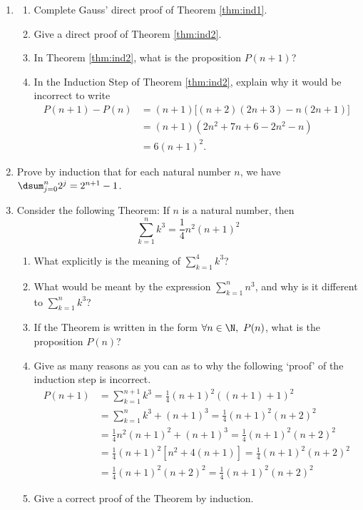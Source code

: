 \begin{enumerate}\renewcommand{\labelenumi}{\thesubsection.\theenumi}
  \item\begin{enumerate}
    \item Complete Gauss' direct proof of Theorem \ref{thm:ind1}.
    \item Give a direct proof of Theorem \ref{thm:ind2}.
    \item In Theorem \ref{thm:ind2}, what is the proposition $P(n+1)$?
    \item In the Induction Step of Theorem \ref{thm:ind2}, explain why it would be incorrect to write
    \begin{align*}
		P(n+1)-P(n)&=(n+1)\bigl[(n+2)(2n+3)-n(2n+1)\bigr]\\
		&=(n+1)(2n^2+7n+6-2n^2-n)\\
		&=6(n+1)^2.
		\end{align*}
  \end{enumerate}
  
  \item Prove by induction that for each natural number $n$, we have $\dsum_{j=0}^n2^j=2^{n+1}-1$.
	
	\item Consider the following Theorem: If $n$ is a natural number, then 
	\[\sum\limits_{k=1}^nk^3=\frac 14n^2(n+1)^2\]
	\begin{enumerate}
	  \item What explicitly is the meaning of $\sum\limits_{k=1}^4k^3$?
	  \item What would be meant by the expression $\sum\limits_{k=1}^nn^3$, and why is it different to $\sum\limits_{k=1}^nk^3$?
	  \item If the Theorem is written in the form $\forall n\in\N,\ P(n)$, what is the proposition $P(n)$?
	  \item Give as many reasons as you can as to why the following `proof' of the induction step is incorrect. 
	  \begin{align*}
	  P(n+1)&=\sum\limits_{k=1}^{n+1}k^3=\frac 14(n+1)^2((n+1)+1)^2\\
	  &=\sum\limits_{k=1}^nk^3+(n+1)^3=\frac 14(n+1)^2(n+2)^2\\
	  &=\frac 14n^2(n+1)^2+(n+1)^3=\frac 14(n+1)^2(n+2)^2\\
	  &=\frac 14(n+1)^2\left[n^2+4(n+1)\right]=\frac 14(n+1)^2(n+2)^2\\
	  &=\frac 14(n+1)^2(n+2)^2=\frac 14(n+1)^2(n+2)^2
	  \end{align*}
	  \item Give a correct proof of the Theorem by induction.
  \end{enumerate}
	

\end{enumerate}
